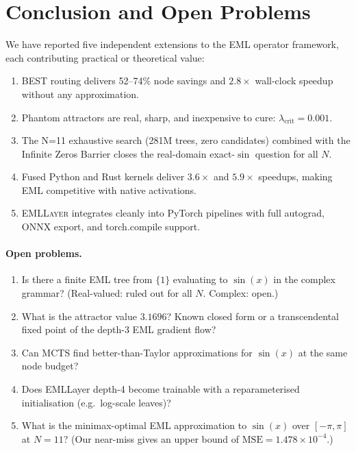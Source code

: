 \documentclass[11pt,a4paper]{article}
\begin{document}
\section{Conclusion and Open Problems}
\label{sec:conclusion}

We have reported five independent extensions to the EML operator
framework, each contributing practical or theoretical value:

\begin{enumerate}
  \item BEST routing delivers 52--74\% node savings and $2.8\times$
    wall-clock speedup without any approximation.
  \item Phantom attractors are real, sharp, and inexpensive to cure:
    $\lambda_{\text{crit}}=0.001$.
  \item The N=11 exhaustive search (281M trees, zero candidates)
    combined with the Infinite Zeros Barrier closes the real-domain
    exact-$\sin$ question for all $N$.
  \item Fused Python and Rust kernels deliver $3.6\times$ and $5.9\times$
    speedups, making EML competitive with native activations.
  \item \textsc{EMLLayer} integrates cleanly into PyTorch pipelines with
    full autograd, ONNX export, and torch.compile support.
\end{enumerate}

\paragraph{Open problems.}
\begin{enumerate}
  \item Is there a finite EML tree from $\{1\}$ evaluating to
    $\sin(x)$ in the complex grammar?
    (Real-valued: ruled out for all $N$.  Complex: open.)
  \item What is the attractor value $3.1696$?  Known closed form or
    a transcendental fixed point of the depth-3 EML gradient flow?
  \item Can MCTS find better-than-Taylor approximations for $\sin(x)$
    at the same node budget?
  \item Does EMLLayer depth-4 become trainable with a reparameterised
    initialisation (e.g.\ log-scale leaves)?
  \item What is the minimax-optimal EML approximation to $\sin(x)$
    over $[{-\pi},\pi]$ at $N=11$?
    (Our near-miss gives an upper bound of $\mathrm{MSE}=1.478\times10^{-4}$.)
\end{enumerate}
\end{document}
